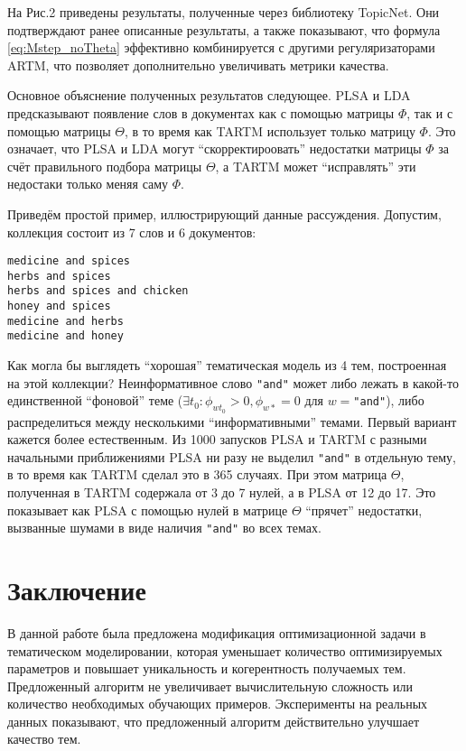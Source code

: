 На Рис.2 приведены результаты, полученные через библиотеку TopicNet. Они подтверждают ранее описанные результаты, а также показывают, что формула \ref{eq:Mstep_noTheta} эффективно комбинируется с другими регуляризаторами ARTM, что позволяет дополнительно увеличивать метрики качества.



Основное объяснение полученных результатов следующее. PLSA и LDA предсказывают появление слов в документах как с помощью матрицы $\Phi$, так и с помощью матрицы $\Theta$, в то время как TARTM использует только матрицу $\Phi$. Это означает, что PLSA и LDA могут ``скорректироовать'' недостатки матрицы $\Phi$ за счёт правильного подбора матрицы $\Theta$, а TARTM может ``исправлять'' эти недостаки только меняя саму $\Phi$.

Приведём простой пример, иллюстрирующий данные рассуждения. Допустим, коллекция состоит из 7 слов и 6 документов:
\begin{verbatim}
medicine and spices
herbs and spices
herbs and spices and chicken
honey and spices
medicine and herbs
medicine and honey 
\end{verbatim}

Как могла бы выглядеть ``хорошая'' тематическая модель из 4 тем, построенная на этой коллекции? Неинформативное слово \texttt{"and"} может либо лежать в какой-то единственной ``фоновой'' теме ($\exists t_0: \phi_{wt_0} > 0, \phi_{w\ast} = 0$ для $w=$\texttt{"and"}), либо распределиться между несколькими ``информативными'' темами. Первый вариант кажется более естественным. Из 1000 запусков PLSA и TARTM с разными начальными приближениями PLSA ни разу не выделил \texttt{"and"} в отдельную тему, в то время как TARTM сделал это в 365 случаях. При этом матрица $\Theta$, полученная в TARTM содержала от 3 до 7 нулей, а в PLSA от 12 до 17. Это показывает как PLSA с помощью нулей в матрице $\Theta$ ``прячет'' недостатки, вызванные шумами в виде наличия \texttt{"and"} во всех темах.

\section{Заключение}

В данной работе была предложена модификация оптимизационной задачи в тематическом моделировании, которая уменьшает количество оптимизируемых параметров и повышает уникальность и когерентность получаемых тем. Предложенный алгоритм не увеличивает вычислительную сложность или количество необходимых обучающих примеров. Эксперименты на реальных данных показывают, что предложенный алгоритм действительно улучшает качество тем.

